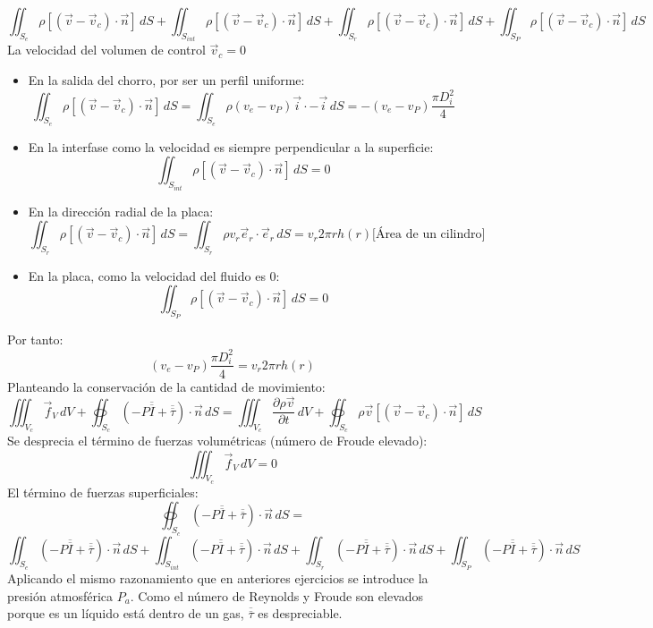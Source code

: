 \begin{enumerate}
{	\[
	\iint_{S_e} \rho\left[(\vec{v}-\vec{v}_c)\cdot\vec{n}\right] \,dS
	+
	\iint_{S_{int}} \rho\left[(\vec{v}-\vec{v}_c)\cdot\vec{n}\right] \,dS
	+
	\iint_{S_r} \rho\left[(\vec{v}-\vec{v}_c)\cdot\vec{n}\right] \,dS
	+
	\iint_{S_P} \rho\left[(\vec{v}-\vec{v}_c)\cdot\vec{n}\right] \,dS
	\]
	La velocidad del volumen de control $\vec{v}_c=0$
	\begin{itemize}
		\item En la salida del chorro, por ser un perfil uniforme:
			\[\iint_{S_e} \rho\left[(\vec{v}-\vec{v}_c)\cdot\vec{n}\right] \,dS=
			\iint_{S_e} \rho \left( v_e-v_P \right)\vec{i}\cdot-\vec{i} \,dS=
			-\left(v_e-v_P\right)\dfrac{\pi D^2_i}{4}\]
		\item En la interfase como la velocidad es siempre perpendicular a la superficie:
			\[\iint_{S_{int}}\rho\left[(\vec{v}-\vec{v}_c)\cdot\vec{n}\right]\,dS=0\]
		\item En la dirección radial de la placa:
			\[\iint_{S_r} \rho\left[(\vec{v}-\vec{v}_c)\cdot\vec{n}\right] \,dS=\iint_{S_r} \rho v_r\vec{e}_r\cdot\vec{e}_r \,dS=v_r2\pi r h(r) \text{[Área de un cilindro]}\]
		\item En la placa, como la velocidad del fluido es 0:
			\[\iint_{S_P} \rho\left[(\vec{v}-\vec{v}_c)\cdot\vec{n}\right]\,dS=0\]
	\end{itemize}
	Por tanto:
		\[\left(v_e-v_P\right)\dfrac{\pi D^2_i}{4}=v_r2\pi r h(r)\]
	Planteando la conservación de la cantidad de movimiento:
		\[\iiint_{V_c}\vec{f}_V\,dV
		+
		\oiint_{S_c}\left(-P\overline{\overline{I}}+\overline{\overline{\tau}}\right)\cdot\vec{n}\,dS=
		\iiint_{V_c}\dfrac{\partial \rho\vec{v}}{\partial t}\,dV
		+ \oiint_{S_c}\rho\vec{v}\left[\left(\vec{v}-\vec{v}_c\right)\cdot\vec{n}\right]\,dS\]
	Se desprecia el término de fuerzas volumétricas (número de Froude elevado):
		\[\iiint_{V_c}\vec{f}_V\,dV=0\]
	El término de fuerzas superficiales:
		\[\oiint_{S_c}\left(-P\overline{\overline{I}}+\overline{\overline{\tau}}\right)\cdot\vec{n}\,dS=\]
		\[
		\iint_{S_e}\left(-P\overline{\overline{I}}+\overline{\overline{\tau}}\right)\cdot\vec{n}\,dS
		+
		\iint_{S_{int}}\left(-P\overline{\overline{I}}+\overline{\overline{\tau}}\right)\cdot\vec{n}\,dS
		+
		\iint_{S_r}\left(-P\overline{\overline{I}}+\overline{\overline{\tau}}\right)\cdot\vec{n}\,dS
		+
		\iint_{S_P}\left(-P\overline{\overline{I}}+\overline{\overline{\tau}}\right)\cdot\vec{n}\,dS
		\]
	Aplicando el mismo razonamiento que en anteriores ejercicios se introduce la presión atmosférica $P_a$. Como el número de Reynolds y Froude son elevados porque es un líquido está dentro de un gas, $\overline{\overline{\tau}} $ es despreciable.
}
\end{enumerate}
